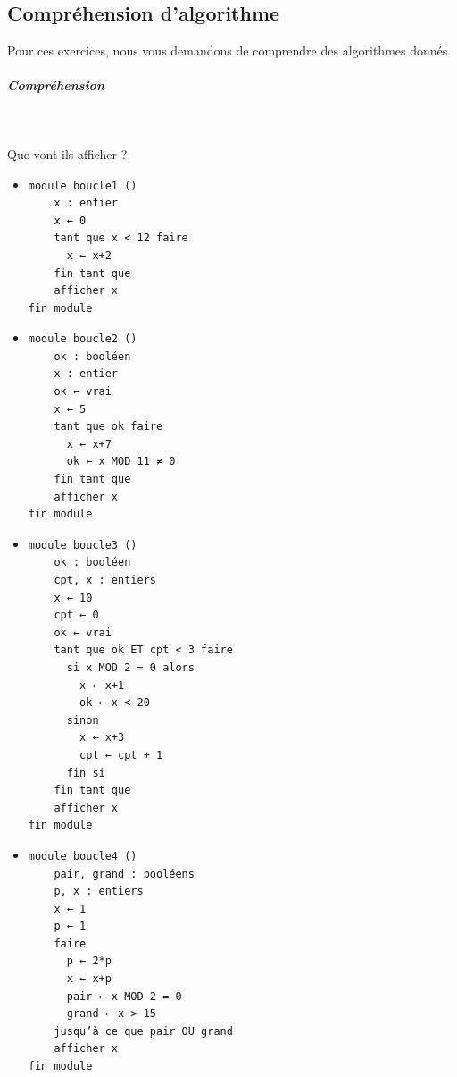 \documentclass[11pt,a4paper]{article}
\begin{document}
            \par
        \subsection{Compr\'ehension d'algorithme}
          Pour ces exercices, nous vous demandons de comprendre des algorithmes donn\'es. 
          
			
		\subparagraph{Compr\'ehension} 
		
                \textcolor{white}{.} \par
            
							  Que vont-ils afficher ?
              
					\begin{itemize}
				
			\item \begin{verbatim}
module boucle1 ()
    x : entier
    x ← 0
    tant que x < 12 faire
      x ← x+2
    fin tant que
    afficher x
fin module
				\end{verbatim} \textcolor{gray}{\underline{\hspace*{2em}}} 
			\item \begin{verbatim}
module boucle2 ()
    ok : booléen
    x : entier
    ok ← vrai
    x ← 5
    tant que ok faire
      x ← x+7
      ok ← x MOD 11 ≠ 0
    fin tant que
    afficher x
fin module
				\end{verbatim} \textcolor{gray}{\underline{\hspace*{2em}}} 
			\item \begin{verbatim}
module boucle3 ()
    ok : booléen
    cpt, x : entiers
    x ← 10
    cpt ← 0
    ok ← vrai
    tant que ok ET cpt < 3 faire
      si x MOD 2 = 0 alors
        x ← x+1
        ok ← x < 20
      sinon
        x ← x+3
        cpt ← cpt + 1
      fin si
    fin tant que
    afficher x
fin module
				\end{verbatim} \textcolor{gray}{\underline{\hspace*{2em}}} 
			\item \begin{verbatim}
module boucle4 ()
    pair, grand : booléens
    p, x : entiers
    x ← 1
    p ← 1
    faire
      p ← 2*p
      x ← x+p
      pair ← x MOD 2 = 0
      grand ← x > 15
    jusqu’à ce que pair OU grand
    afficher x
fin module
				\end{verbatim} \textcolor{gray}{\underline{\hspace*{2em}}} 

\end{itemize}
\end{document}

